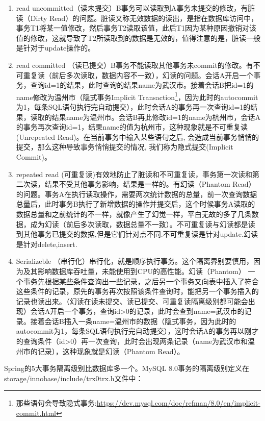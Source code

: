 \documentclass[../../../interview-questions.tex]{subfiles}
\begin{document}
\begin{enumerate}
\item {read uncommitted（读未提交）B事务可以读取到A事务未提交的修改，有脏读（Dirty Read）的问题。}脏读又称无效数据的读出，是指在数据库访问中，事务T1将某一值修改，然后事务T2读取该值，此后T1因为某种原因撤销对该值的修改，这就导致了T2所读取到的数据是无效的，值得注意的是，脏读一般是针对于update操作的。
\item{read committed （读已提交）B事务不能读取其他事务未commit的修改。有不可重复读（前后多次读取，数据内容不一致），幻读的问题。}会话A开启一个事务，查询id=1的结果，此时查询的结果name为武汉市。接着会话B把id=1的name修改为温州市（隐式事务Implicit Transaction\footnote{那些语句会导致隐式事务:\url{https://dev.mysql.com/doc/refman/8.0/en/implicit-commit.html}}，因为此时的autocommit为1，每条SQL语句执行完自动提交），此时会话A的事务再一次查询id=1的结果，读取的结果name为温州市。会话B再此修改id=1的name为杭州市，会话A的事务再次查询id=1，结果name的值为杭州市，这种现象就是不可重复读(Unrepeated Read)。在当前事务中输入某些语句之后, 会造成当前事务悄悄的提交，那么这种导致事务悄悄提交的情况, 我们称为隐式提交(Implicit Commit)。
\item{repeated read (可重复读)有效地防止了脏读和不可重复读，事务第一次读和第二次读，结果不受其他事务影响，结果是一样的。有幻读（Phantom Read）的问题。事务A在执行读取操作，需要两次统计数据的总量，前一次查询数据总量后，此时事务B执行了新增数据的操作并提交后，这个时候事务A读取的数据总量和之前统计的不一样，就像产生了幻觉一样，平白无故的多了几条数据，成为幻读（前后多次读取，数据总量不一致）。不可重复读与幻读都是读到其他事务已提交的数据,但是它们针对点不同.不可重复读是针对update.幻读是针对delete,insert.}
\item{Serializeble （串行化）串行化，就是顺序执行事务。这个隔离界别要慎用，因为及其影响数据库吞吐量，未能使用到CPU的高性能。}幻读（Phantom）
一个事务先根据某些条件查询出一些记录，之后另一个事务又向表中插入了符合这些条件的记录，原先的事务再次按照该条件查询时，能把另一个事务插入的记录也读出来。（幻读在读未提交、读已提交、可重复读隔离级别都可能会出现）会话A开启一个事务，查询id>0的记录，此时会查到name=武汉市的记录。接着会话B插入一条name=温州市的数据（隐式事务，因为此时的autocommit为1，每条SQL语句执行完自动提交），这时会话A的事务再以刚才的查询条件（id>0）再一次查询，此时会出现两条记录（name为武汉市和温州市的记录），这种现象就是幻读（Phantom Read）。
\end{enumerate}

Spring的5大事务隔离级别比数据库多一个。MySQL 8.0事务的隔离级别定义在storage/innobase/include/trx0trx.h文件中：
\end{document}
